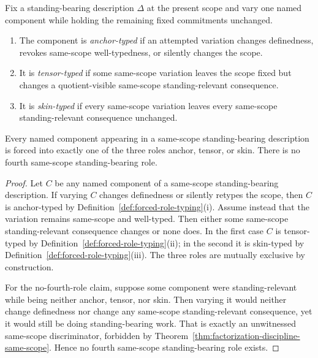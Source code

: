 \begin{definition}\label{def:forced-role-typing}
Fix a standing-bearing description $\Delta$ at the present scope and vary one named component while holding the remaining fixed commitments unchanged.
\begin{enumerate}[label=(\roman*), leftmargin=2.2em]
\item The component is \emph{anchor-typed} if an attempted variation changes definedness, revokes same-scope well-typedness, or silently changes the scope.
\item It is \emph{tensor-typed} if some same-scope variation leaves the scope fixed but changes a quotient-visible same-scope standing-relevant consequence.
\item It is \emph{skin-typed} if every same-scope variation leaves every same-scope standing-relevant consequence unchanged.
\end{enumerate}
\end{definition}

\begin{theorem}\label{thm:ats-role-minimality-no-fourth-role}
Every named component appearing in a same-scope standing-bearing description is forced into exactly one of the three roles anchor, tensor, or skin. There is no fourth same-scope standing-bearing role.
\end{theorem}

\begin{proof}
Let $C$ be any named component of a same-scope standing-bearing description. If varying $C$ changes definedness or silently retypes the scope, then $C$ is anchor-typed by Definition~\ref{def:forced-role-typing}(i). Assume instead that the variation remains same-scope and well-typed. Then either some same-scope standing-relevant consequence changes or none does. In the first case $C$ is tensor-typed by Definition~\ref{def:forced-role-typing}(ii); in the second it is skin-typed by Definition~\ref{def:forced-role-typing}(iii). The three roles are mutually exclusive by construction.

For the no-fourth-role claim, suppose some component were standing-relevant while being neither anchor, tensor, nor skin. Then varying it would neither change definedness nor change any same-scope standing-relevant consequence, yet it would still be doing standing-bearing work. That is exactly an unwitnessed same-scope discriminator, forbidden by Theorem~\ref{thm:factorization-discipline-same-scope}. Hence no fourth same-scope standing-bearing role exists.
\end{proof}

